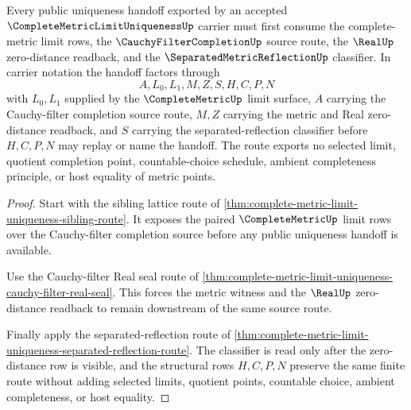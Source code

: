 \begin{theorem}
\label{thm:complete-metric-limit-uniqueness-public-handoff-route}
Every public uniqueness handoff exported by an accepted $\CompleteMetricLimitUniquenessUp$ carrier must first consume the complete-metric limit rows, the $\CauchyFilterCompletionUp$ source route, the $\RealUp$ zero-distance readback, and the $\SeparatedMetricReflectionUp$ classifier. In carrier notation the handoff factors through
$$
A,L_{0},L_{1},M,Z,S,H,C,P,N
$$
with $L_{0},L_{1}$ supplied by the $\CompleteMetricUp$ limit surface, $A$ carrying the Cauchy-filter completion source route, $M,Z$ carrying the metric and Real zero-distance readback, and $S$ carrying the separated-reflection classifier before $H,C,P,N$ may replay or name the handoff. The route exports no selected limit, quotient completion point, countable-choice schedule, ambient completeness principle, or host equality of metric points.
\end{theorem}
\begin{proof}
Start with the sibling lattice route of \autoref{thm:complete-metric-limit-uniqueness-sibling-route}. It exposes the paired $\CompleteMetricUp$ limit rows over the Cauchy-filter completion source before any public uniqueness handoff is available.

Use the Cauchy-filter Real seal route of \autoref{thm:complete-metric-limit-uniqueness-cauchy-filter-real-seal}. This forces the metric witness and the $\RealUp$ zero-distance readback to remain downstream of the same source route.

Finally apply the separated-reflection route of \autoref{thm:complete-metric-limit-uniqueness-separated-reflection-route}. The classifier is read only after the zero-distance row is visible, and the structural rows $H,C,P,N$ preserve the same finite route without adding selected limits, quotient points, countable choice, ambient completeness, or host equality.
\end{proof}
